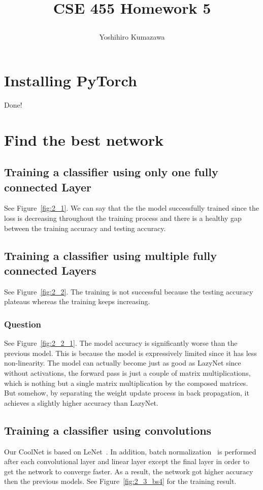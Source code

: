 \documentclass[12pt]{article}
\title{
  \vspace{-2cm}
  CSE 455 Homework 5 \\
  \author{Yoshihiro Kumazawa}
}
\begin{document}
\maketitle

\section{Installing PyTorch}
Done!

\section{Find the best network}
\subsection{Training a classifier using only one fully connected Layer}
See Figure~\ref{fig:2_1}. We can say that the the model successfully trained since the loss is decreasing throughout the training process and there is a healthy gap between the training accuracy and testing accuracy.

\subsection{Training a classifier using multiple fully connected Layers}
See Figure~\ref{fig:2_2}. The training is not successful because the testing accuracy plateaus whereas the training keeps increasing.

\subsubsection{Question}
See Figure~\ref{fig:2_2_1}. The model accuracy is significantly worse than the previous model. This is because the model is expressively limited since it has less non-linearity. The model can actually become just as good as LazyNet since without activations, the forward pass is just a couple of matrix multiplications, which is nothing but a single matrix multiplication by the composed matrices. But somehow, by separating the weight update process in back propagation, it achieves a slightly higher accuracy than LazyNet.

\subsection{Training a classifier using convolutions}
Our CoolNet is based on LeNet~\cite{Lecun98gradient-basedlearning}. In addition, batch normalization~\cite{pmlr-v37-ioffe15} is performed after each convolutional layer and linear layer except the final layer in order to get the network to converge faster. As a result, the network got higher accuracy then the previous models. See Figure~\ref{fig:2_3_bs4} for the training result.
\end{document}
